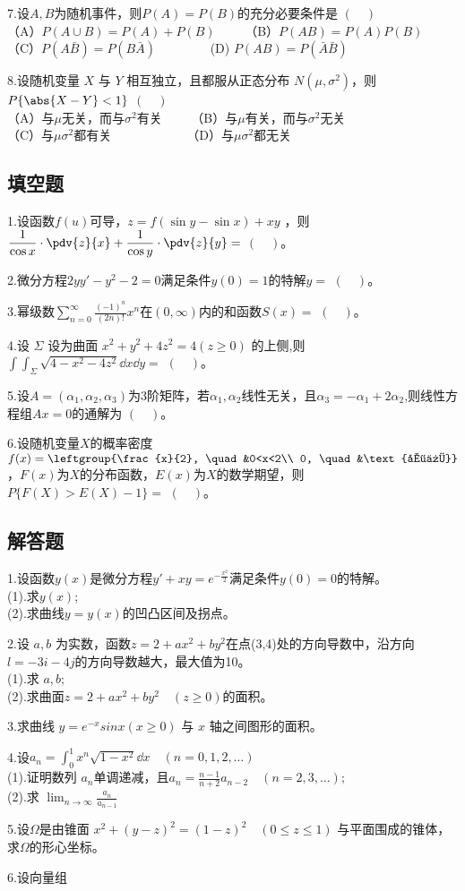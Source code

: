 7.设$A,B$为随机事件，则$P(A)=P(B)$的充分必要条件是 $(\quad)$\\
（A）$P( A \cup B)=P(A)+P(B) \qquad$  （B）$P(AB)=P(A)P(B)$\\
（C）$P(A\bar{ B })=P(B\bar{A}) \qquad \qquad$  (D) $P(AB)=P(\bar {A}\bar {B})$ 

8.设随机变量 $X$ 与 $Y$ 相互独立，且都服从正态分布 $N(\mu,\sigma ^2)$，则$P \{\abs{X-Y}<1\}$ $(\quad)$\\
（A）与$\mu$无关，而与$\sigma ^2$有关 $\qquad$（B）与$\mu$有关，而与$\sigma ^2$无关\\
（C）与$\mu \sigma ^2$都有关$\qquad \qquad \qquad$（D）与$\mu \sigma ^2$都无关



\subsection{填空题}
1.设函数$f(u)$可导，$z=f(\sin y-\sin x)+xy$ ，则 $\displaystyle \frac{1}{\cos x}\cdot \pdv{z}{x}+\frac{1}{\cos y}\cdot \pdv{z}{y}=$ $(\quad)$。

2.微分方程$2yy'-y^2-2=0$满足条件$y(0)=1$的特解$y=$ $(\quad)$。

3.幂级数$\displaystyle \sum_{n=0}^\infty \frac{(-1)^n}{(2n)!} x^n$在$(0,\infty)$内的和函数$S(x)=$ $(\quad)$。

4.设 $\Sigma$ 设为曲面 $x^2+y^2+4z^2=4 (z\ge 0)$ 的上侧,则$\int\int_{\Sigma} \sqrt{4-x^2-4z^2}\dd{x}\dd{y}=$ $(\quad)$。

5.设$A=(\alpha_1,\alpha_2,\alpha_3)$为3阶矩阵，若$\alpha_1,\alpha_2$线性无关，且$\alpha_3=-\alpha_1+2\alpha_2$,则线性方程组$Ax=0$的通解为 $(\quad)$。

6.设随机变量$X$的概率密度$f(x)=\leftgroup{\frac{x}{2}, \quad &0<x<2\\  0, \quad &\text{其他}}$ ，$F(x)$为$X$的分布函数，$E(x)$为$X$的数学期望，则$P\{F(X)>E(X)-1\}=$ $(\quad)$。


\subsection{解答题}
1.设函数$y(x)$是微分方程$y'+xy=e^{-\frac{x^2}{2}}$满足条件$y(0)=0$的特解。\\
(1).求$y(x)$;\\
(2).求曲线$y=y(x)$的凹凸区间及拐点。

2.设 $a,b$ 为实数，函数$z=2+ax^2+by^2$在点(3,4)处的方向导数中，沿方向$l=-3i-4j$的方向导数越大，最大值为10。\\
(1).求 $a,b$;\\
(2).求曲面$z=2+ax^2+by^2 \quad(z\geqslant 0)$的面积。

3.求曲线 $y=e^{-x}sinx(x\geqslant 0)$ 与 $x$ 轴之间图形的面积。

4.设$a_n=\int_0^1 x^n \sqrt{1-x^2}\dd{x}\quad (n=0,1,2,\dots)$\\
(1).证明数列 ${a_n}$单调递减，且$\displaystyle a_n=\frac{n-1}{n+2}a_{n-2}\quad (n=2,3,\dots);$\\
(2).求 $\displaystyle \lim_{n \to \infty}\frac{a_n}{a_{n-1}}$

5.设$\Omega$是由锥面 $x^2+(y-z)^2=(1-z)^2 \quad (0\leqslant z \leqslant 1)$ 与平面围成的锥体，求$\Omega$的形心坐标。

6.设向量组